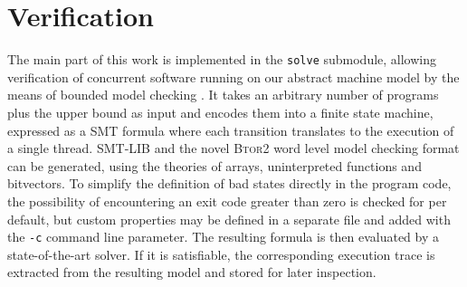 \newcommand{\SMTLIB}{SMT-LIB}
\newcommand{\BTOR}{\textsc{Btor2}}

\section{Verification}

The main part of this work is implemented in the \texttt{solve} submodule,
allowing verification of concurrent software running on our abstract machine model by the means of bounded model checking \cite{ref:BMC}.
It takes an arbitrary number of programs plus the upper bound as input and encodes them into a finite state machine, expressed as a SMT formula where each transition translates to the execution of a single thread.
\SMTLIB{} \cite{ref:SMT-Lib} and the novel \BTOR{} \cite{ref:BTOR2} word level model checking format can be generated, using the theories of arrays, uninterpreted functions and bitvectors.
To simplify the definition of bad states directly in the program code, the possibility of encountering an exit code greater than zero is checked for per default, but custom properties may be defined in a separate file and added with the \texttt{-c} command line parameter.
The resulting formula is then evaluated by a state-of-the-art solver.
If it is satisfiable, the corresponding execution trace is extracted from the resulting model and stored for later inspection.


